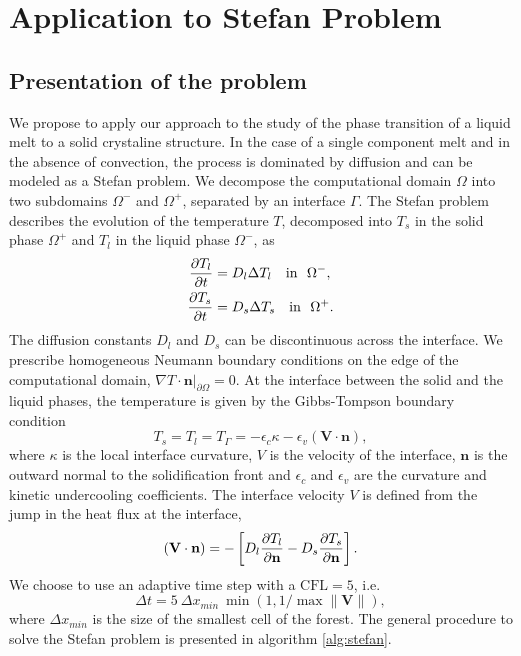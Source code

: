 \section{Application to Stefan Problem} \label{sec:application}

\subsection{Presentation of the problem}

We propose to apply our approach to the study of the phase transition of a liquid melt to a solid crystaline structure. In the case of a single component melt and in the absence of convection, the process is dominated by diffusion and can be modeled as a Stefan problem. We decompose the computational domain $\Omega$ into two subdomains $\Omega^-$ and $\Omega^+$, separated by an interface $\Gamma$. The Stefan problem describes the evolution of the temperature $T$, decomposed into $T_s$ in the solid phase $\Omega^+$ and $T_l$ in the liquid phase $\Omega^-$, as
\begin{align}
\frac{\partial T_l}{\partial t} & = D_l \Delta T_l \quad \mathrm{in} ~~ \Omega^-, \label{eq:stefan_heat_equation_l} \\
\frac{\partial T_s}{\partial t} & = D_s \Delta T_s \quad \mathrm{in} ~~ \Omega^+. \label{eq:stefan_heat_equation_s}
\end{align}
The diffusion constants $D_l$ and $D_s$ can be discontinuous across the interface. We prescribe homogeneous Neumann boundary conditions on the edge of the computational domain, $\nabla T \cdot \mathbf{n}\vert_{\partial \Omega}=0$. At the interface between the solid and the liquid phases, the temperature is given by the Gibbs-Tompson boundary condition \cite{Alexiades;Solomon;Wilson:88:The-formation-of-a-s, Alexiades;Solomon:93:Mathematical-Modelin}
\begin{equation} \label{eq:stefan_gibbs_tompson}
T_s = T_l = T_{\Gamma} = -\epsilon_c \kappa - \epsilon_v (\mathbf{V} \cdot \mathbf{n}),
\end{equation}
where $\kappa$ is the local interface curvature, $V$ is the velocity of the interface, $\mathbf{n}$ is the outward normal to the solidification front and $\epsilon_c$ and $\epsilon_v$ are the curvature and kinetic undercooling coefficients. The interface velocity $V$ is defined from the jump in the heat flux at the interface,
\begin{equation} \label{eq:stefan_velocity}
(\mathbf{V} \cdot \mathbf{n}) = - \left[ D_l \frac{\partial T_l}{\partial \mathbf{n}} - D_s \frac{\partial T_s}{\partial \mathbf{n}} \right].
\end{equation}
We choose to use an adaptive time step with a $\text{CFL} = 5$, i.e.
\begin{equation} \label{eq:stefan_dt}
\Delta t = 5 ~ \Delta x_{min} ~ \min(1,1/\max \lVert \mathbf{V} \rVert),
\end{equation}
where $\Delta x_{min}$ is the size of the smallest cell of the forest. The general procedure to solve the Stefan problem is presented in algorithm \ref{alg:stefan}.

